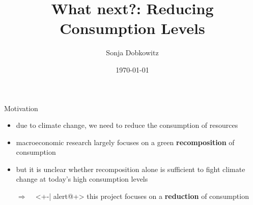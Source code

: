 \documentclass[11pt,aspectratio=169]{beamer}
\author[Sonja Dobkowitz]{\small Sonja Dobkowitz}
\institute[University of Bonn]{University of Bonn}
\title{What next?: Reducing Consumption Levels}
\institute{University of Bonn}
\date{\today}
\newcommand{\ar}{$\Rightarrow$ \ }
\begin{document}
	
	{
		\begin{frame}
		\titlepage
	\end{frame}
}



\begin{frame}{Motivation}

\begin{itemize}[<+-| alert@+>]
	
	\item<+-| alert@+> due to climate change, we need to reduce the consumption of resources
	\vspace{4mm}
	\item<+-| alert@+> macroeconomic research largely focuses on a green \textbf{\textcolor{cyan!100}{recomposition}} of consumption 
\vspace{4mm}
	\item<+-| alert@+>  but it is unclear whether recomposition alone is sufficient to fight climate change at today's high consumption levels%

\vspace{4mm}
	\item[\ar]<+-| alert@+>  this project focuses on a \textbf{\textcolor{cyan!100}{reduction}}  of consumption %
\end{itemize}
\end{frame}
\end{document}
